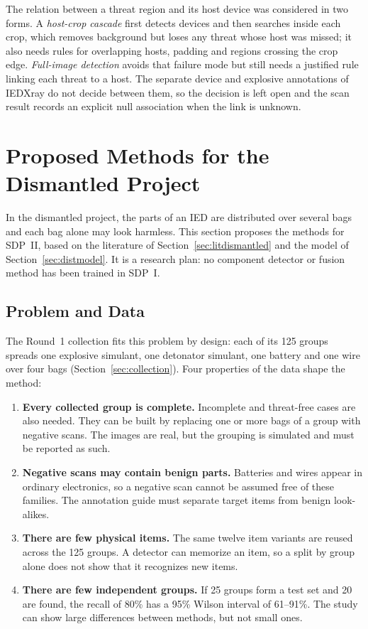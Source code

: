 The relation between a threat region and its host device was considered in two
forms. A \emph{host-crop cascade} first detects devices and then searches inside
each crop, which removes background but loses any threat whose host was missed;
it also needs rules for overlapping hosts, padding and regions crossing the crop
edge. \emph{Full-image detection} avoids that failure mode but still needs a
justified rule linking each threat to a host. The separate device and explosive
annotations of IEDXray do not decide between them, so the decision is left open
and the scan result records an explicit null association when the link is unknown.

\section{Proposed Methods for the Dismantled Project}\label{sec:dismantled}
In the dismantled project, the parts of an IED are distributed over several bags and
each bag alone may look harmless. This section proposes the methods for SDP~II, based
on the literature of Section~\ref{sec:litdismantled} and the model of
Section~\ref{sec:distmodel}. It is a research plan: no component detector or fusion
method has been trained in SDP~I.

\subsection{Problem and Data}
The Round~1 collection fits this problem by design: each of its 125 groups spreads one
explosive simulant, one detonator simulant, one battery and one wire over four bags
(Section~\ref{sec:collection}). Four properties of the data shape the method:
\begin{enumerate}
\item \textbf{Every collected group is complete.} Incomplete and threat-free cases are
also needed. They can be built by replacing one or more bags of a group with negative
scans. The images are real, but the grouping is simulated and must be reported as such.
\item \textbf{Negative scans may contain benign parts.} Batteries and wires appear in
ordinary electronics, so a negative scan cannot be assumed free of these families. The
annotation guide must separate target items from benign look-alikes.
\item \textbf{There are few physical items.} The same twelve item variants are
reused across the 125 groups. A detector can memorize an item, so a split by group alone does not show that
it recognizes new items.
\item \textbf{There are few independent groups.} If 25 groups form a test set and 20
are found, the recall of 80\% has a 95\% Wilson interval of 61--91\%. The study can
show large differences between methods, but not small ones.
\end{enumerate}

